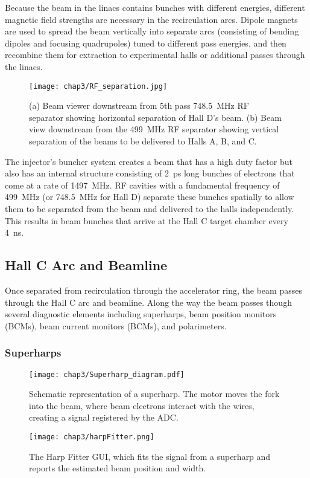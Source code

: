 Because the beam in the linacs contains bunches with different energies,
different magnetic field strengths are necessary in the recirculation arcs.
Dipole magnets are used to spread the beam vertically into separate arcs
(consisting of bending dipoles and focusing quadrupoles)
tuned to different pass energies, and then recombine them for extraction to
experimental halls or additional passes through the linacs.


\begin{figure}[!h]
    \centering
    \texttt{[image: chap3/RF\_separation.jpg]}
    \caption[Pictures of the beam viewer from two positions.]{(a) Beam viewer downstream from 5th pass \SI{748.5}{MHz} RF
             separator showing horizontal separation of Hall D's beam.
             (b) Beam view downstream from the \SI{499}{MHz} RF separator
             showing vertical separation of the beams to be delivered to Halls
             A, B, and C.
             }
    \label{fig:RF_separation}
\end{figure}


The injector's buncher system creates a beam that has a high duty factor but
also has an internal structure consisting of \SI{2}{ps} long bunches of
electrons that come at a rate of \SI{1497}{MHz}.
RF cavities with a fundamental frequency of \SI{499}{MHz} (or \SI{748.5}{MHz}
for Hall D) separate these bunches spatially to allow them to be separated from
the beam and delivered to the halls independently.
This results in beam bunches that arrive at the Hall C target chamber every
\SI{4}{ns}.

\subsection{Hall C Arc and Beamline}
Once separated from recirculation through the accelerator ring, the beam passes
through the Hall C arc and beamline.
Along the way the beam passes though several diagnostic elements including
superharps, beam position monitors (BCMs), beam current monitors (BCMs), and
polarimeters.


\subsubsection{Superharps}
\begin{figure}[!h]
    \centering
    \texttt{[image: chap3/Superharp\_diagram.pdf]}
    \caption[Schematic representation of a superharp.]{Schematic representation of a superharp. The motor moves the fork
             into the beam, where beam electrons interact with the wires,
             creating a signal registered by the ADC.}
    \label{fig:superharp_diagram}
\end{figure}
\begin{figure}[!h]
    \centering
    \texttt{[image: chap3/harpFitter.png]}
    \caption[The Harp Fitter GUI.]{The Harp Fitter GUI, which fits the signal from a superharp and
             reports the estimated beam position and width.
            }
    \label{fig:harp_fitter}
\end{figure}

